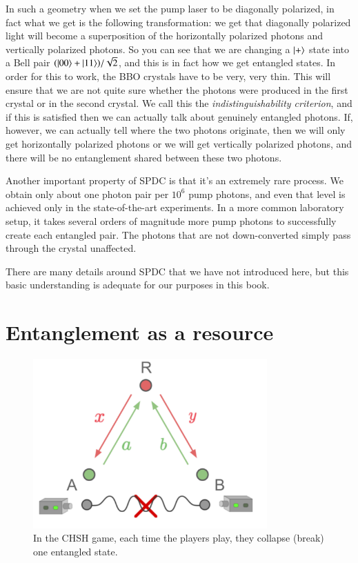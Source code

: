 In such a geometry when we set the pump laser to be diagonally polarized, in fact what we get is the following transformation: we get that diagonally polarized light will become a superposition of the horizontally polarized photons and vertically polarized photons. So you can see that we are changing a $\left| + \right\rangle$ state into a Bell pair $(\left| 00 \right\rangle+\left| 11 \right\rangle)/\sqrt{2}$, and this is in fact how we get entangled states.  In order for this to work, the BBO crystals have to be very, very thin. This will ensure that we are not quite sure whether the photons were produced in the first crystal or in the second crystal. We call this the \emph{indistinguishability criterion}, and if this is satisfied then we can actually talk about genuinely entangled photons. If, however, we can actually tell where the two photons originate, then we will only get horizontally polarized photons or we will get vertically polarized photons, and there will be no entanglement shared between these two photons. 

Another important property of SPDC is that it's an extremely rare process.  We obtain only about one photon pair per $10^6$ pump photons, and even that level is achieved only in the state-of-the-art experiments. In a more common laboratory setup, it takes several orders of magnitude more pump photons to successfully create each entangled pair.  The photons that are not down-converted simply pass through the crystal unaffected.

There are many details around SPDC that we have not introduced here, but this basic understanding is adequate for our purposes in this book.



\section{Entanglement as a resource}

\begin{figure}[H]
   \centering
    \includegraphics[width=0.8\textwidth]{lesson4/CHSH_broken_entanglement.pdf}
    
        \caption{In the CHSH game, each time the players play, they collapse (break) one entangled state.}
    
    \label{fig:chsh-broken}
\end{figure}

